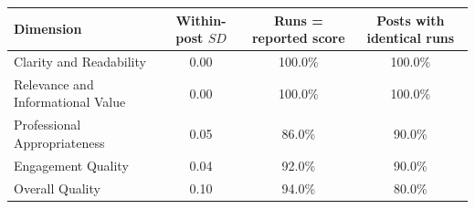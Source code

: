 \begin{tabular}{lccc}
\toprule
Dimension & Within-post $SD$ & Runs = reported score & Posts with identical runs \\
\midrule
Clarity and Readability & 0.00 & 100.0\% & 100.0\% \\
Relevance and Informational Value & 0.00 & 100.0\% & 100.0\% \\
Professional Appropriateness & 0.05 & 86.0\% & 90.0\% \\
Engagement Quality & 0.04 & 92.0\% & 90.0\% \\
Overall Quality & 0.10 & 94.0\% & 80.0\% \\
\bottomrule
\end{tabular}
